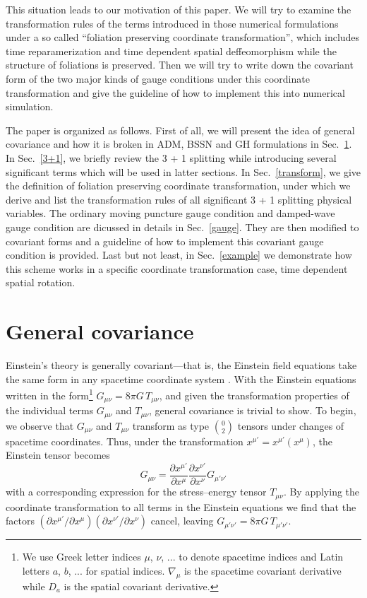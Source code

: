 \documentclass[letterpaper,nofootinbib,prd,amsmath,onecolumn]{revtex4-1}
\begin{document}
This situation leads to our motivation of this paper. We will try to examine the transformation rules of the terms introduced in those numerical formulations under a so called ``foliation preserving coordinate transformation'', which includes time reparamerization and time dependent spatial deffeomorphism while the structure of foliations is preserved. Then we will try to write down the covariant form of the two major kinds of gauge conditions under this coordinate transformation and give the guideline of how to implement this into numerical simulation. 

The paper is organized as follows. First of all, we will present the idea of general covariance and how it is broken in ADM, BSSN and GH formulations in Sec.~\ref{covariance}. In Sec.~\ref{3+1}, we briefly review the 3 + 1 splitting while introducing several significant terms which will be used in latter sections. In Sec.~\ref{transform}, we give the definition of foliation preserving coordinate transformation, under which we derive and list the transformation rules of all significant 3 + 1 splitting physical variables. The ordinary moving puncture gauge condition and damped-wave gauge condition are dicussed in details in Sec.~\ref{gauge}. They are then modified to covariant forms and a guideline of how to implement this covariant gauge condition is provided. Last but not least, in Sec.~\ref{example} we demonstrate how this scheme works in a specific coordinate transformation case, time dependent spatial rotation.
\section{General covariance}\label{covariance}
Einstein's theory is generally covariant---that is, the Einstein field equations take the same 
form in any spacetime coordinate system \cite{Weinberg, Wald}. With the 
Einstein equations written in the form\footnote{We use Greek letter indices $\mu$, $\nu$, ... to denote spacetime indices and Latin 
letters $a$, $b$, ... for spatial indices. $\nabla_{\mu}$ is the spacetime covariant derivative while $D_{a}$ is the spatial 
covariant derivative.} $G_{\mu\nu} = 8\pi G\, T_{\mu\nu}$, and given the transformation properties 
of the individual terms $G_{\mu\nu}$ and $T_{\mu\nu}$, general covariance is trivial to show. To begin, we observe that 
$G_{\mu\nu}$ and $T_{\mu\nu}$ transform as type $0\choose 2$ tensors under changes of spacetime coordinates. Thus, under the  
transformation $x^{\mu'} = x^{\mu'}\left(x^\mu\right)$, the Einstein tensor becomes
\begin{equation}
	G_{\mu\nu} = \frac{\partial x^{\mu'}}{\partial x^{\mu}} \frac{\partial x^{\nu'}}{\partial x^{\nu}} G_{\mu'\nu'} 
\end{equation}
with a corresponding expression for the stress--energy tensor $T_{\mu\nu}$. By applying the coordinate transformation 
to all terms in the Einstein equations we find that the factors 
$\left(\partial x^{\mu'}/\partial x^{\mu}\right) \left(\partial x^{\nu'}/\partial x^{\nu}\right)$
cancel, leaving $G_{\mu'\nu'} = 8\pi G\, T_{\mu'\nu'}$. 
\end{document}

